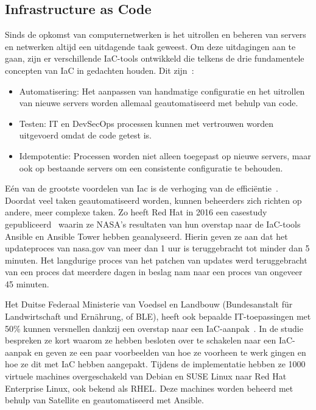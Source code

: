 \subsection{Infrastructure as Code}%
\label{sub:iac}

Sinds de opkomst van computernetwerken is het uitrollen en beheren van servers en netwerken altijd een uitdagende taak geweest.
Om deze uitdagingen aan te gaan, zijn er verschillende IaC-tools ontwikkeld die telkens de drie fundamentele concepten van IaC in gedachten houden.
Dit zijn~\autocite{chef-what-is-iac}:
\begin{itemize}
    \item Automatisering: Het aanpassen van handmatige configuratie en het uitrollen van nieuwe servers worden allemaal geautomatiseerd met behulp van code.
    \item Testen: IT en DevSecOps processen kunnen met vertrouwen worden uitgevoerd omdat de code getest is.
    \item Idempotentie: Processen worden niet alleen toegepast op nieuwe servers, maar ook op bestaande servers om een consistente configuratie te behouden.
\end{itemize}

E\'en van de grootste voordelen van Iac is de verhoging van de effici\"entie~\autocite{splunk-benefits-iac}.
Doordat veel taken geautomatiseerd worden, kunnen beheerders zich richten op andere, meer complexe taken.
Zo heeft Red Hat in 2016 een casestudy gepubliceerd~\autocite{case-study-nasa-iac} waarin ze NASA's resultaten van hun overstap naar de IaC-tools Ansible en Ansible Tower hebben geanalyseerd.
Hierin geven ze aan dat het updateproces van nasa.gov van meer dan 1 uur is teruggebracht tot minder dan 5 minuten.
Het langdurige proces van het patchen van updates werd teruggebracht van een proces dat meerdere dagen in beslag nam naar een proces van ongeveer 45 minuten.

Het Duitse Federaal Ministerie van Voedsel en Landbouw (Bundesanstalt f\"ur Landwirtschaft und Ern\"ahrung, of BLE), heeft ook bepaalde IT-toepassingen met 50\% kunnen versnellen dankzij een overstap naar een IaC-aanpak~\autocite{case-study-ble-iac}.
In de studie bespreken ze kort waarom ze hebben besloten over te schakelen naar een IaC-aanpak en geven ze een paar voorbeelden van hoe ze voorheen te werk gingen en hoe ze dit met IaC hebben aangepakt.
Tijdens de implementatie hebben ze 1000 virtuele machines overgeschakeld van Debian en SUSE Linux naar Red Hat Enterprise Linux, ook bekend als RHEL.
Deze machines worden beheerd met behulp van Satellite en geautomatiseerd met Ansible.

